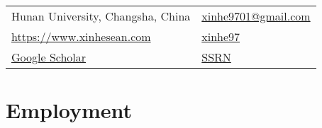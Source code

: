 \documentclass{clean_cv}
\author{Xin He}
\begin{document}
\maketitle
%
\begin{center}
\begin{tabular}{ll}
	 Hunan University, Changsha, China 
	&
	 \href{mailto:xinh@hnu.edu.cn}{ \color{orange} xinhe9701@gmail.com } \\
	 \href{https://www.xinhesean.com}{ \color{orange} https://www.xinhesean.com} 
	&
	 \href{https://github.com/xinhe97}{ \color{orange} xinhe97 } \\
   	 \href{https://scholar.google.com/citations?user=qD8bY00AAAAJ&hl=en&authuser=2}{ \color{orange}Google Scholar }
   	&
	 \href{https://papers.ssrn.com/sol3/cf_dev/AbsByAuth.cfm?per_id=3071233}{ \color{orange} SSRN } \\
\end{tabular}
\end{center}

\vspace{-1.5em}


\section{Employment}

\begin{datetabular}{9em}

	
\end{datetabular}

\end{document}
